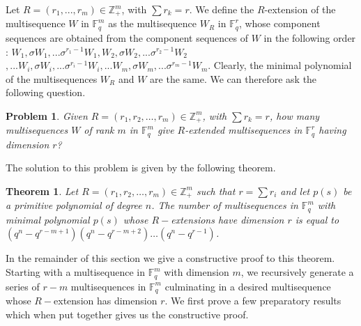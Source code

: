 \documentclass[letterpaper, 12 pt]{article}  \usepackage{amssymb}
\newtheorem{theorem}{Theorem}[section]
\newtheorem{problem}{Problem}
\newcommand{\F}{\mathbb{F}}
\begin{document}
Let $R = (r_1, ... , r_m) \in \mathbb{Z}_+^m$, with $\sum r_{k} = r$. We define
the $R$-extension of the multisequence $W$ in $\F_q^m$ as the multisequence
$W_R$ in $\F_q^r$, whose component sequences are obtained from the component 
sequences of $W$ in the following order : $W_1, \sigma W_1, ... \sigma^{r_1 - 
1}W_1, W_2, \sigma W_2, ... \sigma^{r_2 - 1}W_2$ $, ... W_i, \sigma W_i, ... 
\sigma^{r_i - 1}W_i, ... W_m, \sigma W_m, ... \sigma^{r_m - 1}W_m$. Clearly, the
minimal polynomial of the 
multisequences $W_R$ and $W$ are the same. We can
therefore ask the following question.

\begin{problem}
\label{mainProblem}
 Given $R = (r_1,r_2,\ldots , r_m) \in \mathbb{Z}_+^m$, 
with $\sum r_k = r$, how many multisequences $W$ of rank $m$ in $\F_q^m$ give 
$R$-extended multisequences in $\F_q^r$ having dimension $r$?
\end{problem}

The solution to this problem is given by the following theorem.

 \begin{theorem}
\label{maintheorem}
Let $R = (r_1,r_2,\ldots,r_m) \in \mathbb{Z}_+^{m}$ such that 
$r = \sum r_i$ and let $p(s)$ be a primitive polynomial of degree
$n$. The number  of multisequences in
$\F_q^m$ with minimal polynomial $p(s)$ whose $R-$extensions have dimension $r$
is equal to $(q^n-q^{r-m+1})(q^n - q^{r-m+2})\ldots(q^n - q^{r-1}) $.
\end{theorem}

In the remainder of this section we give a constructive proof to this theorem.
Starting with a multisequence in $\F_q^m$ with dimension $m$, we recursively
generate a series
of $r-m$ multisequences in $\F_q^m$ culminating in a desired multisequence
whose $R-$extension has dimension $r$. We first prove a few preparatory
results which when put together gives us the constructive proof.   
 
\end{document}
